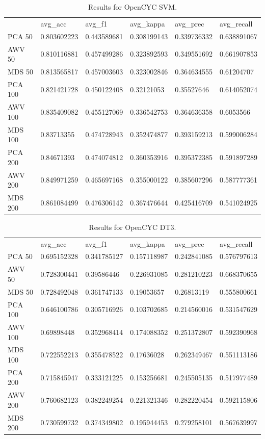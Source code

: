 \begin{table}[]
	\begin{tabular}{llllll}
		& avg\_acc    & avg\_f1     & avg\_kappa  & avg\_prec   & avg\_recall \\
		PCA 50  & 0.803602223 & 0.443589681 & 0.308199143 & 0.339736332 & 0.638891067 \\
		AWV 50  & 0.810116881 & 0.457499286 & 0.323892593 & 0.349551692 & 0.661907853 \\
		MDS 50  & 0.813565817 & 0.457003603 & 0.323002846 & 0.364634555 & 0.61204707  \\
		PCA 100 & 0.821421728 & 0.450122408 & 0.32121053  & 0.35527646  & 0.614052074 \\
		AWV 100 & 0.835409082 & 0.455127069 & 0.336542753 & 0.364636358 & 0.6053566   \\
		MDS 100 & 0.83713355  & 0.474728943 & 0.352474877 & 0.393159213 & 0.599006284 \\
		PCA 200 & 0.84671393  & 0.474074812 & 0.360353916 & 0.395372385 & 0.591897289 \\
		AWV 200 & 0.849971259 & 0.465697168 & 0.355000122 & 0.385607296 & 0.587777361 \\
		MDS 200 & 0.861084499 & 0.476306142 & 0.367476644 & 0.425416709 & 0.541024925
	\end{tabular}
	\caption{Results for OpenCYC SVM.}
	\label{table:Newsgroups}
\end{table}

\begin{table}[]
	\begin{tabular}{llllll}
		& avg\_acc    & avg\_f1     & avg\_kappa  & avg\_prec   & avg\_recall \\
		PCA 50  & 0.695152328 & 0.341785127 & 0.157118987 & 0.242841085 & 0.576797613 \\
		AWV 50  & 0.728300441 & 0.39586446  & 0.226931085 & 0.281210223 & 0.668370655 \\
		MDS 50  & 0.728492048 & 0.361747133 & 0.19053657  & 0.26813119  & 0.555800661 \\
		PCA 100 & 0.646100786 & 0.305716926 & 0.103702685 & 0.214560016 & 0.531547629 \\
		AWV 100 & 0.69898448  & 0.352968414 & 0.174088352 & 0.251372807 & 0.592390968 \\
		MDS 100 & 0.722552213 & 0.355478522 & 0.17636028  & 0.262349467 & 0.551113186 \\
		PCA 200 & 0.715845947 & 0.333121225 & 0.153256681 & 0.245505135 & 0.517977489 \\
		AWV 200 & 0.760682123 & 0.382249254 & 0.221321346 & 0.282220454 & 0.592115806 \\
		MDS 200 & 0.730599732 & 0.374349802 & 0.195944453 & 0.279258101 & 0.567639997
	\end{tabular}
	\caption{Results for OpenCYC DT3.}
	\label{table:Newsgroups}
\end{table}


